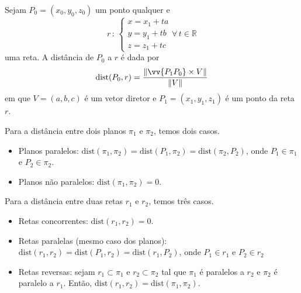 \documentclass[../main.tex]{subfiles}
\begin{document}
			\begin{proposicao}
				Sejam $P_0=(x_0,y_0,z_0)$ um ponto qualquer e
				\[
				r \, \colon\, \begin{cases}
					x=x_1+ta\\
					y=y_1+tb\\
					z=z_1+tc
				\end{cases} \forall\, t\in \mathbb{R}
				\]
				uma reta. A distância de $P_0$ a $r$ é dada por
				\[
				\text{dist}(P_0, r)=\frac{\|\vv{P_1P_0}\times V\|}{\|V\|}
				\]
				em que $V=(a,b,c)$ é um vetor diretor e $P_1=(x_1,y_1,z_1)$ é um ponto da reta $r$.
			\end{proposicao}
			Para a distância entre dois planos $\pi_1$ e $\pi_2$, temos dois casos.
			\begin{itemize}
				\item Planos paralelos: $\text{dist}(\pi_1,\pi_2)=\text{dist}(P_1,\pi_2)=\text{dist}(\pi_2,P_2)$, onde $P_1\in \pi_1$ e $P_2\in \pi_2$.
				\item Planos não paralelos: $\text{dist}(\pi_1,\pi_2)=0$.
			\end{itemize}
			
			Para a distância entre duas retas $r_1$ e $r_2$, temos três casos.
			\begin{itemize}
				\item Retas concorrentes: $\text{dist}(r_1,r_2)=0$.
				\item Retas paralelas (mesmo caso dos planos): $\text{dist}(r_1,r_2)=\text{dist}(P_1,r_2)=\text{dist}(r_1,P_2)$, onde $P_1\in r_1$ e $P_2\in r_2$
				\item Retas reversas: sejam $r_1\subset \pi_1$ e $r_2\subset \pi_2$ tal que $\pi_1$ é paralelos a $r_2$ e $\pi_2$ é paralelo a $r_1$. Então, $\text{dist}(r_1,r_2)=\text{dist}(\pi_1,\pi_2)$.
			\end{itemize}
\end{document}
